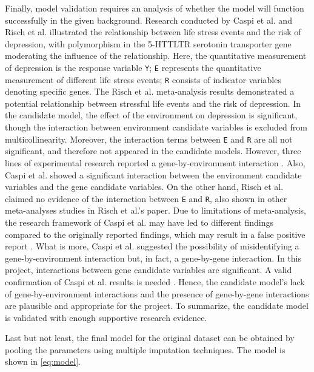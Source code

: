 \documentclass[11pt]{article}
\begin{document}
Finally, model validation requires an analysis of whether the model will function successfully in the given background. Research conducted by Caspi et al. \cite{ar:caspi} and Risch et al. \cite{ar:risch} illustrated the relationship between life stress events and the risk of depression, with polymorphism in the 5-HTTLTR serotonin transporter gene moderating the influence of the relationship. Here, the quantitative measurement of depression is the response variable \texttt{Y}; \texttt{E} represents the quantitative measurement of different life stress events; \texttt{R} consists of indicator variables denoting specific genes. The Risch et al. \cite{ar:risch} meta-analysis results demonstrated a potential relationship between stressful life events and the risk of depression. In the candidate model, the effect of the environment on depression is significant, though the interaction between environment candidate variables is excluded from multicollinearity. Moreover, the interaction terms between \texttt{E} and \texttt{R} are all not significant, and therefore not appeared in the candidate models. However, three lines of experimental research reported a gene-by-environment interaction \cite{ar:caspi}. Also, Caspi et al. \cite{ar:caspi} showed a significant interaction between the environment candidate variables and the gene candidate variables. On the other hand, Risch et al. \cite{ar:risch} claimed no evidence of the interaction between \texttt{E} and \texttt{R}, also shown in other meta-analyses studies in Risch et al.'s \cite{ar:risch} paper. Due to limitations of meta-analysis, the research framework of Caspi et al. \cite{ar:caspi} may have led to different findings compared to the originally reported findings, which may result in a false positive report \cite{ar:risch}. What is more, Caspi et al. \cite{ar:caspi} suggested the possibility of misidentifying a gene-by-environment interaction but, in fact, a gene-by-gene interaction. In this project, interactions between gene candidate variables are significant. A valid confirmation of Caspi et al. \cite{ar:caspi} results is needed \cite{ar:risch}. Hence, the candidate model's lack of gene-by-environment interactions and the presence of gene-by-gene interactions are plausible and appropriate for the project. To summarize, the candidate model is validated with enough supportive research evidence. 

Last but not least, the final model for the original dataset can be obtained by pooling the parameters using multiple imputation techniques. The model is shown in \autoref{eq:model}. 
\end{document}
